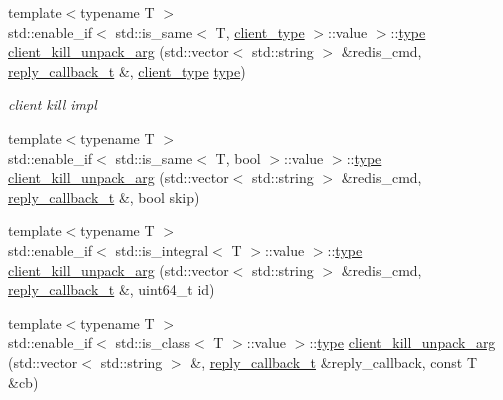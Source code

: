 \begin{DoxyCompactItemize}
\item 
{\footnotesize template$<$typename T $>$ }\\std\+::enable\+\_\+if$<$ std\+::is\+\_\+same$<$ T, \hyperlink{classcpp__redis_1_1client_a388877b01b4e045cddb138e70a68e000}{client\+\_\+type} $>$\+::value $>$\+::\hyperlink{classcpp__redis_1_1client_ac284ea9a5c0e95d49a675403aaf4847c}{type} \hyperlink{classcpp__redis_1_1client_a6a1bfc9e37967c4a602d917f87a5b929}{client\+\_\+kill\+\_\+unpack\+\_\+arg} (std\+::vector$<$ std\+::string $>$ \&redis\+\_\+cmd, \hyperlink{classcpp__redis_1_1client_a061a1140d36d2eaeda82b09a0bb3f9f2}{reply\+\_\+callback\+\_\+t} \&, \hyperlink{classcpp__redis_1_1client_a388877b01b4e045cddb138e70a68e000}{client\+\_\+type} \hyperlink{classcpp__redis_1_1client_ac284ea9a5c0e95d49a675403aaf4847c}{type})
\begin{DoxyCompactList}\small\item\em client kill impl \end{DoxyCompactList}\item 
{\footnotesize template$<$typename T $>$ }\\std\+::enable\+\_\+if$<$ std\+::is\+\_\+same$<$ T, bool $>$\+::value $>$\+::\hyperlink{classcpp__redis_1_1client_ac284ea9a5c0e95d49a675403aaf4847c}{type} \hyperlink{classcpp__redis_1_1client_a9b6a6f361db2ca27d4714447088729fe}{client\+\_\+kill\+\_\+unpack\+\_\+arg} (std\+::vector$<$ std\+::string $>$ \&redis\+\_\+cmd, \hyperlink{classcpp__redis_1_1client_a061a1140d36d2eaeda82b09a0bb3f9f2}{reply\+\_\+callback\+\_\+t} \&, bool skip)
\item 
{\footnotesize template$<$typename T $>$ }\\std\+::enable\+\_\+if$<$ std\+::is\+\_\+integral$<$ T $>$\+::value $>$\+::\hyperlink{classcpp__redis_1_1client_ac284ea9a5c0e95d49a675403aaf4847c}{type} \hyperlink{classcpp__redis_1_1client_a903f6271de841721661359c4be055adb}{client\+\_\+kill\+\_\+unpack\+\_\+arg} (std\+::vector$<$ std\+::string $>$ \&redis\+\_\+cmd, \hyperlink{classcpp__redis_1_1client_a061a1140d36d2eaeda82b09a0bb3f9f2}{reply\+\_\+callback\+\_\+t} \&, uint64\+\_\+t id)
\item 
{\footnotesize template$<$typename T $>$ }\\std\+::enable\+\_\+if$<$ std\+::is\+\_\+class$<$ T $>$\+::value $>$\+::\hyperlink{classcpp__redis_1_1client_ac284ea9a5c0e95d49a675403aaf4847c}{type} \hyperlink{classcpp__redis_1_1client_ab07713bcc08277292f6dc64ae89c1134}{client\+\_\+kill\+\_\+unpack\+\_\+arg} (std\+::vector$<$ std\+::string $>$ \&, \hyperlink{classcpp__redis_1_1client_a061a1140d36d2eaeda82b09a0bb3f9f2}{reply\+\_\+callback\+\_\+t} \&reply\+\_\+callback, const T \&cb)

\end{DoxyCompactItemize}
